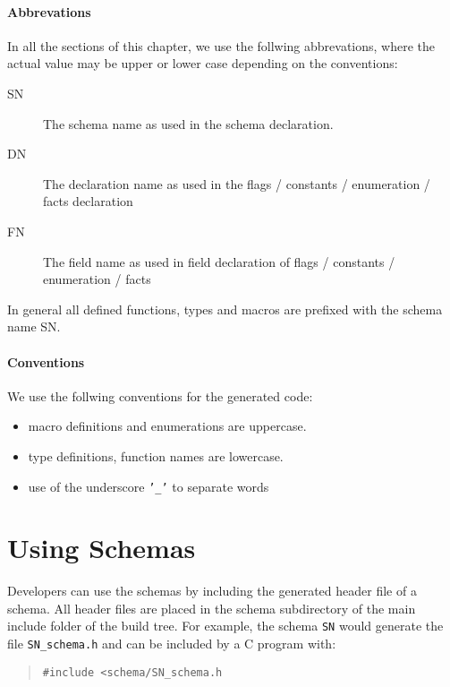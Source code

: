 \documentclass[a4paper,11pt,twoside]{report}
\begin{document}
{{\paragraph{Abbrevations}
In all the sections of this chapter, we use the follwing abbrevations, where 
the actual value may be upper or lower case depending on the conventions:

\begin{description}
  \item[SN] The schema name as used in the schema declaration.
  \item[DN] The declaration name as used in the flags / constants / 
            enumeration / facts declaration
  \item[FN] The field name as used in field declaration of flags / constants / 
            enumeration / facts
\end{description}

In general all defined functions, types and macros are prefixed with the schema
name SN.

\paragraph{Conventions}
We use the follwing conventions for the generated code:
\begin{itemize}
  \item macro definitions and enumerations are uppercase.
  \item type definitions, function names are lowercase.
  \item use of the underscore \texttt{'\_'} to separate words
\end{itemize}


\section{Using Schemas}

Developers can use the schemas by including the generated header file of a 
schema. All header files are placed in the schema subdirectory of the main 
include folder of the build tree. For example, the 
schema \texttt{SN} would generate the file \texttt{SN\_schema.h} and can 
be included by a C program with:
\begin{quote}
\texttt{\#include <schema/SN\_schema.h}
\end{quote}

}}
\end{document}

